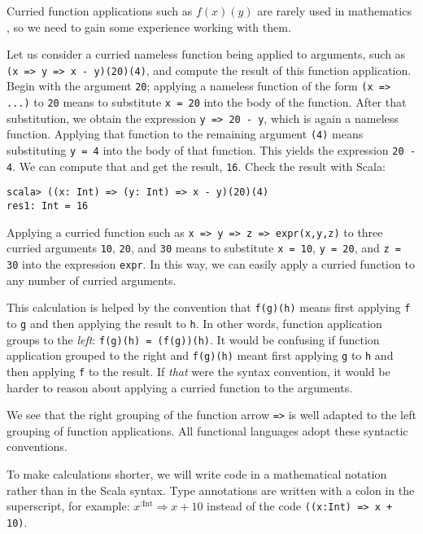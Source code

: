 Curried function applications such as $f(x)(y)$ are rarely used in
mathematics , so we need to gain some experience working with them.

Let us consider a curried nameless function being applied to arguments,
such as \lstinline!(x => y => x - y)(20)(4)!, and compute the result
of this function application. Begin with the argument \lstinline!20!;
applying a nameless function of the form \lstinline!(x => ...)! to
\lstinline!20! means to substitute \lstinline!x = 20! into the body
of the function. After that substitution, we obtain the expression
\lstinline!y => 20 - y!, which is again a nameless function. Applying
that function to the remaining argument \lstinline!(4)! means substituting
\lstinline!y = 4! into the body of that function. This yields the
expression \lstinline!20 - 4!. We can compute that and get the result,
\lstinline!16!. Check the result with Scala:
\begin{lstlisting}
scala> ((x: Int) => (y: Int) => x - y)(20)(4)
res1: Int = 16
\end{lstlisting}

Applying a curried function such as \lstinline!x => y => z => expr(x,y,z)!
to three curried arguments \lstinline!10!, \lstinline!20!, and \lstinline!30!
means to substitute \lstinline!x = 10!, \lstinline!y = 20!, and
\lstinline!z = 30! into the expression \lstinline!expr!. In this
way, we can easily apply a curried function to any number of curried
arguments.

This calculation is helped by the convention that \lstinline!f(g)(h)!
means first applying \lstinline!f! to \lstinline!g! and then applying
the result to \lstinline!h!. In other words, function application
groups to the \emph{left}: \lstinline!f(g)(h) = (f(g))(h)!. It would
be confusing if function application grouped to the right and \lstinline!f(g)(h)!
meant first applying \lstinline!g! to \lstinline!h! and then applying
\lstinline!f! to the result. If \emph{that} were the syntax convention,
it would be harder to reason about applying a curried function to
the arguments.

We see that the right grouping of the function arrow \lstinline!=>!
is well adapted to the left grouping of function applications. All
functional languages adopt these syntactic conventions.

To make calculations shorter, we will write code in a mathematical
notation rather than in the Scala syntax. Type annotations are written
with a colon in the superscript, for example: $x^{:\text{Int}}\Rightarrow x+10$
instead of the code \lstinline!((x:Int) => x + 10)!.

